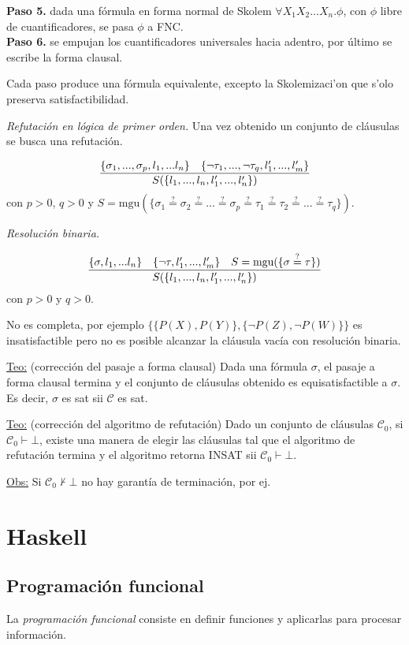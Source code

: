 \documentclass[12pt]{extarticle}
\def\teorema{\underline{Teo:} }
\def\observacion{\underline{Obs:} }
\def\equ{\overset{?}{=}}
\def\ssspace{\space\space\space}
\begin{document}
\textbf{Paso 5.} dada una fórmula en forma normal de Skolem $\forall\!X_1X_2...X_n.\phi$, con $\phi$ libre de cuantificadores, se pasa $\phi$ a FNC. \\
\textbf{Paso 6.} se empujan los cuantificadores universales hacia adentro, por último se escribe la forma clausal.

Cada paso produce una fórmula equivalente, excepto la Skolemizaci'on que s'olo preserva satisfactibilidad.

\textit{Refutación en lógica de primer orden.} 
Una vez obtenido un conjunto de cláusulas se busca una refutación.

$$\frac{\{\sigma_1,...,\sigma_p,l_1,...l_n\} \text{\ssspace} \{\neg\tau_1,...,\neg\tau_q,l'_1,...,l'_m\} }{S(\{l_1,...,l_n,l'_1,...,l'_n\})}$$
con $p > 0$, $q > 0$ y $S=\text{mgu}(\{\sigma_1\equ\sigma_2\equ...\equ\sigma_p\equ\tau_1\equ\tau_2\equ...\equ\tau_q\})$.

\textit{Resolución binaria.} 

$$\frac{\{\sigma,l_1,...l_n\} \text{\ssspace} \{\neg\tau,l'_1,...,l'_m\} \text{\ssspace} S=\text{mgu}(\{\sigma\equ\tau\})}{S(\{l_1,...,l_n,l'_1,...,l'_n\})}$$
con $p > 0$ y $q > 0$.

No es completa, por ejemplo $\{\{P(X),P(Y)\},\{\neg P(Z), \neg P(W)\}\}$ es insatisfactible pero no es posible alcanzar la cláusula vacía con resolución binaria.

\teorema (corrección del pasaje a forma clausal)
Dada una fórmula $\sigma$, el pasaje a forma clausal termina y el conjunto de cláusulas obtenido es equisatisfactible a $\sigma$. Es decir, $\sigma$ es sat sii $\mathcal{C}$ es sat.

\teorema (corrección del algoritmo de refutación)
Dado un conjunto de cláusulas $\mathcal{C}_0$, si $\mathcal{C}_0\vdash\bot$, existe una manera de elegir las cláusulas tal que el algoritmo de refutación termina y el algoritmo retorna INSAT sii $\mathcal{C}_0\vdash\bot$.

\observacion Si $\mathcal{C}_0\not\vdash\bot$ no hay garantía de terminación, por ej.

\section{Haskell}

\subsection{Programación funcional}
La \textit{programación funcional} consiste en definir funciones y aplicarlas para procesar información.
\end{document}
